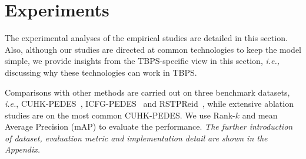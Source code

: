 \documentclass[letterpaper]{article} %
\begin{document}
\section{Experiments}
The experimental analyses of the empirical studies are detailed in this section. 
Also, although our studies are directed at common technologies to keep the model simple, we provide insights from the TBPS-specific view in this section, \emph{i.e.,} discussing why these technologies can work in TBPS.

Comparisons with other methods are carried out on three benchmark datasets, \emph{i.e.}, CUHK-PEDES~\cite{li2017person}, ICFG-PEDES~\cite{ding2021semantically} and RSTPReid~\cite{zhu2021dssl}, while extensive ablation studies are on the most common CUHK-PEDES.
We use Rank-$k$ and mean Average Precision (mAP) to evaluate the performance.
\emph{The further introduction of dataset, evaluation metric and implementation detail are shown in the Appendix.}






\end{document}
